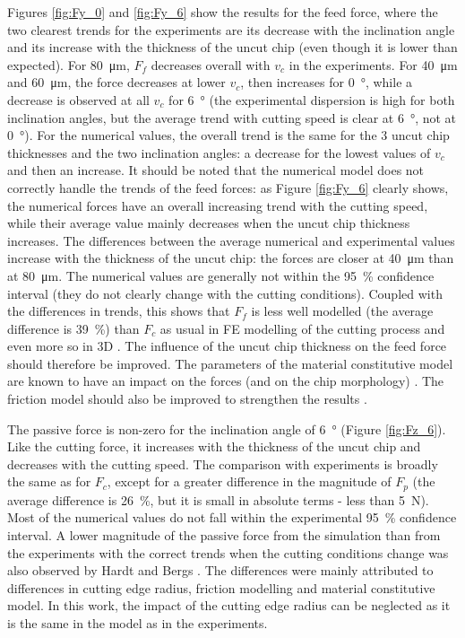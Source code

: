 \documentclass[preprint,12pt,times]{elsarticle}
\begin{document}
Figures \ref{fig:Fy_0} and \ref{fig:Fy_6} show the results for the feed force, where the two clearest trends for the experiments are its decrease with the inclination angle and its increase with the thickness of the uncut chip (even though it is lower than expected). For \qty{80}{\um}, $F_f$ decreases overall with $v_c$ in the experiments. For \qty{40}{\um} and \qty{60}{\um}, the force decreases at lower $v_c$, then increases for \qty{0}{\degree}, while a decrease is observed at all $v_c$ for \qty{6}{\degree} (the experimental dispersion is high for both inclination angles, but the average trend with cutting speed is clear at \qty{6}{\degree}, not at \qty{0}{\degree}). For the numerical values, the overall trend is the same for the 3 uncut chip thicknesses and the two inclination angles: a decrease for the lowest values of $v_c$ and then an increase. It should be noted that the numerical model does not correctly handle the trends of the feed forces: as Figure \ref{fig:Fy_6} clearly shows, the numerical forces have an overall increasing trend with the cutting speed, while their average value mainly decreases when the uncut chip thickness increases. The differences between the average numerical and experimental values increase with the thickness of the uncut chip: the forces are closer at \qty{40}{\um} than at \qty{80}{\um}. The numerical values are generally not within the \qty{95}{\%} confidence interval (they do not clearly change with the cutting conditions). Coupled with the differences in trends, this shows that $F_f$ is less well modelled (the average difference is \qty{39}{\%}) than $F_c$ as usual in FE modelling of the cutting process and even more so in 3D \cite{hardt_Three_2021}. The influence of the uncut chip thickness on the feed force should therefore be improved. The parameters of the material constitutive model are known to have an impact on the forces (and on the chip morphology) \cite{ducobu_Importance_2017,kugalurpalanisamy_Identification_2022}. The friction model should also be improved to strengthen the results \cite{hardt_Three_2021}.

The passive force is non-zero for the inclination angle of \qty{6}{\degree} (Figure \ref{fig:Fz_6}). Like the cutting force, it increases with the thickness of the uncut chip and decreases with the cutting speed. The comparison with experiments is broadly the same as for $F_c$, except for a greater difference in the magnitude of $F_p$ (the average difference is \qty{26}{\%}, but it is small in absolute terms - less than \qty{5}{N}). Most of the numerical values do not fall within the experimental \qty{95}{\%} confidence interval. A lower magnitude of the passive force from the simulation than from the experiments with the correct trends when the cutting conditions change was also observed by Hardt and Bergs \cite{hardt_Three_2021}. The differences were mainly attributed to differences in cutting edge radius, friction modelling and material constitutive model. In this work, the impact of the cutting edge radius can be neglected as it is the same in the model as in the experiments.
\end{document}
